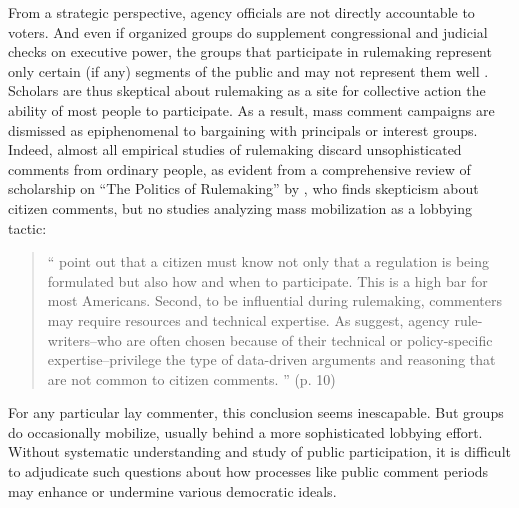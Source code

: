 From a strategic perspective, agency officials are not directly accountable to voters. And even if organized groups do supplement congressional and judicial checks on executive power, the groups that participate in rulemaking represent only certain (if any) segments of the public and may not represent them well \citep{Seifter2016UCLA}. Scholars are thus skeptical about rulemaking as a site for collective action the ability of most people to participate.
As a result, mass comment campaigns are dismissed as epiphenomenal to bargaining with principals or interest groups. Indeed, almost all empirical studies of rulemaking discard unsophisticated comments from ordinary people, as evident from a comprehensive review of scholarship on ``The Politics of Rulemaking'' by \citet{Yackee2018}, who finds skepticism about citizen comments, but no studies analyzing mass mobilization as a lobbying tactic:
\begin{quote}
    ``\citet{Kerwin2011} point out that a citizen must know not only that a regulation is being formulated but also how and when to participate. This is a high bar for most Americans. Second, to be influential during rulemaking, commenters may require resources and technical expertise. As \citet{Epstein2014} suggest, agency rule-writers--who are often chosen because of their technical or policy-specific expertise--privilege the type of data-driven arguments and reasoning that are not common to citizen comments.
    '' (p. 10)
     \end{quote}
For any particular lay commenter, this conclusion seems inescapable. But groups do occasionally mobilize, usually behind a more sophisticated lobbying effort. %
Without systematic understanding and study of public participation, it is difficult to adjudicate such questions about how processes like public comment periods may enhance or undermine various democratic ideals.

